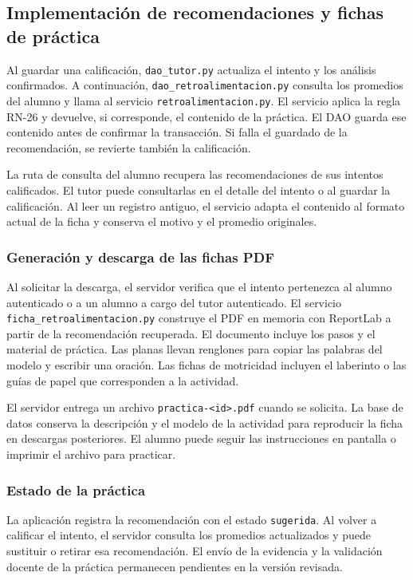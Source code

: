 \subsection{Implementación de recomendaciones y fichas de práctica}
\label{sec:impl-recomendaciones}

Al guardar una calificación, \texttt{dao\_tutor.py} actualiza el intento y los análisis confirmados. A continuación, \texttt{dao\_retroalimentacion.py} consulta los promedios del alumno y llama al servicio \texttt{retroalimentacion.py}. El servicio aplica la regla RN-26 y devuelve, si corresponde, el contenido de la práctica. El DAO guarda ese contenido antes de confirmar la transacción. Si falla el guardado de la recomendación, se revierte también la calificación.

La ruta de consulta del alumno recupera las recomendaciones de sus intentos calificados. El tutor puede consultarlas en el detalle del intento o al guardar la calificación. Al leer un registro antiguo, el servicio adapta el contenido al formato actual de la ficha y conserva el motivo y el promedio originales.

\subsubsection{Generación y descarga de las fichas PDF}

Al solicitar la descarga, el servidor verifica que el intento pertenezca al alumno autenticado o a un alumno a cargo del tutor autenticado. El servicio \texttt{ficha\_retroalimentacion.py} construye el PDF en memoria con ReportLab a partir de la recomendación recuperada. El documento incluye los pasos y el material de práctica. Las planas llevan renglones para copiar las palabras del modelo y escribir una oración. Las fichas de motricidad incluyen el laberinto o las guías de papel que corresponden a la actividad.

El servidor entrega un archivo \texttt{practica-<id>.pdf} cuando se solicita. La base de datos conserva la descripción y el modelo de la actividad para reproducir la ficha en descargas posteriores. El alumno puede seguir las instrucciones en pantalla o imprimir el archivo para practicar.

\subsubsection{Estado de la práctica}

La aplicación registra la recomendación con el estado \texttt{sugerida}. Al volver a calificar el intento, el servidor consulta los promedios actualizados y puede sustituir o retirar esa recomendación. El envío de la evidencia y la validación docente de la práctica permanecen pendientes en la versión revisada.
